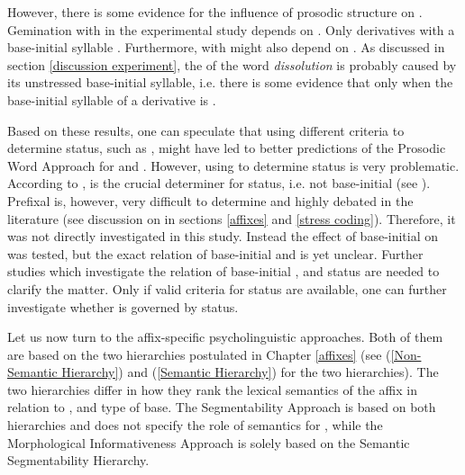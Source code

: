 However, there is some evidence 
for the influence of prosodic structure on . 
Gemination with  in the experimental study depends on . Only derivatives with a  base-initial syllable . Furthermore,  with  might also depend on . As discussed in section  \ref{discussion experiment}, the  of the word \textit{dissolution} is probably caused by its unstressed base-initial syllable, i.e. there is some evidence that  only  when the base-initial syllable of a derivative is . 

Based on these results, one can speculate that using different criteria to determine  status, such as , might have led to better predictions of the Prosodic Word Approach for  and . 
However, using  to determine  status is very problematic. %
 According to \cite{Raffelsiefen.1999},  is the crucial determiner for  status, i.e. not base-initial  (see ). Prefixal  is, however, very difficult to determine and highly debated in the literature (see discussion on  in sections \ref{affixes} and \ref{stress coding}). Therefore, it was not directly investigated in this study. Instead the effect of base-initial  on  was tested, but the exact relation of base-initial  and  is yet unclear.
Further studies which investigate the relation of base-initial ,  and  status are needed to clarify the matter. Only if valid criteria for  status are available, one can further investigate whether  is governed by  status. 

 




Let us now turn to the affix-specific psycholinguistic approaches. Both of them are based on the two  hierarchies postulated in Chapter \ref{affixes} (see  (\ref{Non-Semantic Hierarchy})  and (\ref{Semantic Hierarchy}) for the two hierarchies).
The two hierarchies differ in how they rank the lexical semantics of the affix in relation to ,  and type of base. The Segmentability Approach is based on both hierarchies and does not specify the role of semantics for , while the Morphological Informativeness Approach is solely based on the Semantic Segmentability Hierarchy.%

